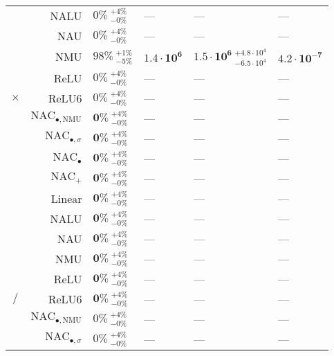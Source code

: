 \begin{longtable}{crllll}
 & NALU & $0\% {~}^{+4\%}_{-0\%}$ & --- & --- & ---\\

 & NAU & $0\% {~}^{+4\%}_{-0\%}$ & --- & --- & ---\\

 & NMU & $98\% {~}^{+1\%}_{-5\%}$ & $\mathbf{1.4 \cdot 10^{6}}$ & $\mathbf{1.5 \cdot 10^{6}} {~}^{+4.8 \cdot 10^{4}}_{-6.5 \cdot 10^{4}}$ & $\mathbf{4.2 \cdot 10^{-7}}$\\

 & ReLU & $0\% {~}^{+4\%}_{-0\%}$ & --- & --- & ---\\

\multirow{-10}{*}{\centering\arraybackslash $\bm{\times}$} & ReLU6 & $0\% {~}^{+4\%}_{-0\%}$ & --- & --- & ---\\
\cmidrule{1-6}
 & $\mathrm{NAC}_{\bullet,\mathrm{NMU}}$ & $\mathbf{0\%} {~}^{+4\%}_{-0\%}$ & --- & --- & ---\\

 & $\mathrm{NAC}_{\bullet,\sigma}$ & $\mathbf{0\%} {~}^{+4\%}_{-0\%}$ & --- & --- & ---\\

 & $\mathrm{NAC}_{\bullet}$ & $\mathbf{0\%} {~}^{+4\%}_{-0\%}$ & --- & --- & ---\\

 & $\mathrm{NAC}_{+}$ & $\mathbf{0\%} {~}^{+4\%}_{-0\%}$ & --- & --- & ---\\

 & Linear & $\mathbf{0\%} {~}^{+4\%}_{-0\%}$ & --- & --- & ---\\

 & NALU & $\mathbf{0\%} {~}^{+4\%}_{-0\%}$ & --- & --- & ---\\

 & NAU & $\mathbf{0\%} {~}^{+4\%}_{-0\%}$ & --- & --- & ---\\

 & NMU & $\mathbf{0\%} {~}^{+4\%}_{-0\%}$ & --- & --- & ---\\

 & ReLU & $\mathbf{0\%} {~}^{+4\%}_{-0\%}$ & --- & --- & ---\\

\multirow{-10}{*}{\centering\arraybackslash $\bm{\mathbin{/}}$} & ReLU6 & $\mathbf{0\%} {~}^{+4\%}_{-0\%}$ & --- & --- & ---\\
\cmidrule{1-6}
 & $\mathrm{NAC}_{\bullet,\mathrm{NMU}}$ & $0\% {~}^{+4\%}_{-0\%}$ & --- & --- & ---\\

 & $\mathrm{NAC}_{\bullet,\sigma}$ & $0\% {~}^{+4\%}_{-0\%}$ & --- & --- & ---\\


\end{longtable}
